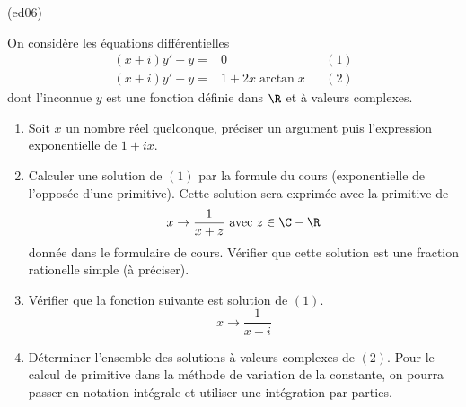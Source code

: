 \begin{tiny}(ed06)\end{tiny}
On considère les équations différentielles
\begin{align*}
(x+i)y'+y =& 0 & & (1)\\
(x+i)y'+y =& 1+2x\arctan x & & (2)
\end{align*}
dont l'inconnue $y$ est une fonction définie dans $\R$ et à valeurs complexes.
\begin{enumerate}
 \item Soit $x$ un nombre réel quelconque, préciser un argument puis l'expression exponentielle de $1+ix$.
\item Calculer une solution de $(1)$ par la formule du cours (exponentielle de l'opposée d'une primitive). Cette solution sera exprimée avec la primitive de
\begin{displaymath}
 x\rightarrow \dfrac{1}{x+z} \text{ avec }z\in \C-\R
\end{displaymath}
donnée dans le formulaire de cours. Vérifier que cette solution est une fraction rationelle simple (à préciser).
\item Vérifier que la fonction suivante est solution de $(1)$.
\begin{displaymath}
 x\rightarrow \frac{1}{x+i}
\end{displaymath}
\item Déterminer l'ensemble des solutions à valeurs complexes de $(2)$.\newline
Pour le calcul de primitive dans la méthode de variation de la constante, on pourra passer en notation intégrale et utiliser une intégration par parties.
\end{enumerate}


